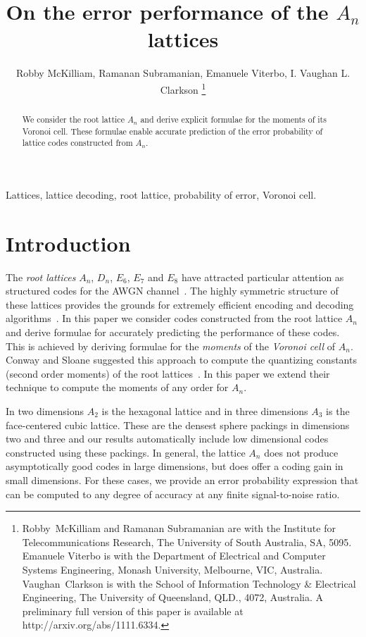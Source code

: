 \documentclass[journal]{IEEEtran}
\title{On the error performance of the $A_n$ lattices}
\author{Robby McKilliam, Ramanan Subramanian, Emanuele Viterbo, I. Vaughan L. Clarkson
 \thanks{Robby~McKilliam and Ramanan Subramanian are with the Institute for Telecommunications Research, The University of South Australia, SA, 5095.  Emanuele Viterbo is with the Department of Electrical and Computer Systems Engineering, Monash University, Melbourne, VIC, Australia.   Vaughan~Clarkson is with the School of Information Technology \& Electrical Engineering, The University of Queensland, QLD., 4072, Australia.  A preliminary full version of this paper is available at http://arxiv.org/abs/1111.6334.}
}
\begin{document}
\newcommand{\calR}{\mathcal{R}}
\newcommand{\hist}{\operatorname{hist}}

\maketitle

\begin{abstract}
We consider the root lattice $A_n$ and derive explicit formulae for the moments of its Voronoi cell.  These formulae enable accurate prediction of the error probability of lattice codes constructed from $A_n$.
\end{abstract}

\begin{keywords}
Lattices, lattice decoding, root lattice, probability of error, Voronoi cell.
\end{keywords}

\section{Introduction}\label{sec:introduction}

The \emph{root lattices} $A_n$, $D_n$, $E_6$, $E_7$ and $E_8$ have attracted particular attention as structured codes for the AWGN channel~\cite{SPLAG}. The highly symmetric structure of these lattices provides the grounds for extremely efficient encoding and decoding algorithms~\cite{Conway1982FastQuantDec,McKilliam2009CoxeterLattices,McKilliam2008}.  In this paper we consider codes constructed from the root lattice $A_n$ and derive formulae for accurately predicting the performance of these codes.  This is achieved by deriving formulae for the \emph{moments} of the \emph{Voronoi cell} of $A_n$.  Conway and Sloane suggested this approach to compute the quantizing constants (second order moments) of the root lattices~\cite{Conway1982VoronoiRegions}.  In this paper we extend their technique to compute the moments of any order for $A_n$.

In two dimensions $A_2$ is the hexagonal lattice and in three dimensions $A_3$ is the face-centered cubic lattice.  These are the densest sphere packings in dimensions two and three and our results automatically include low dimensional codes constructed using these packings.  In general, the lattice $A_n$ does not produce asymptotically good codes in large dimensions, but does offer a coding gain in small dimensions.  For these cases, we provide an error probability expression that can be computed to any degree of accuracy at any finite signal-to-noise ratio.
\end{document}
